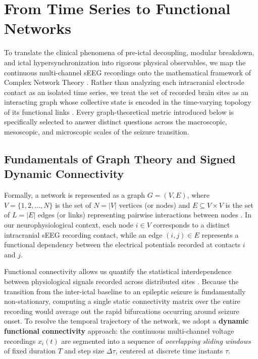 \section{From Time Series to Functional Networks}
\label{sec:theoretical_framework}

To translate the clinical phenomena of pre-ictal decoupling, modular breakdown, and ictal hypersynchronization into rigorous physical observables, we map the continuous multi-channel sEEG recordings onto the mathematical framework of Complex Network Theory \cite{newman2018networks, barabasi2016network}. Rather than analyzing each intracranial electrode contact as an isolated time series, we treat the set of recorded brain sites as an interacting graph whose collective state is encoded in the time-varying topology of its functional links \cite{bullmore2009complex}. Every graph-theoretical metric introduced below is specifically selected to answer distinct questions across the macroscopic, mesoscopic, and microscopic scales of the seizure transition.

\subsection{Fundamentals of Graph Theory and Signed Dynamic Connectivity}
Formally, a network is represented as a graph $G = (V, E)$, where $V = \{1, 2, \dots, N\}$ is the set of $N = |V|$ vertices (or nodes) and $E \subseteq V \times V$ is the set of $L = |E|$ edges (or links) representing pairwise interactions between nodes \cite{newman2018networks}. In our neurophysiological context, each node $i \in V$ corresponds to a distinct intracranial sEEG recording contact, while an edge $(i, j) \in E$ represents a functional dependency between the electrical potentials recorded at contacts $i$ and $j$.

Functional connectivity allows us quantify the statistical interdependence between physiological signals recorded across distributed sites \cite{bullmore2009complex}. Because the transition from the inter-ictal baseline to an epileptic seizure is fundamentally non-stationary, computing a single static connectivity matrix over the entire recording would average out the rapid bifurcations occurring around seizure onset. To resolve the temporal trajectory of the network, we adopt a \textbf{dynamic functional connectivity} approach: the continuous multi-channel voltage recordings $x_i(t)$ are segmented into a sequence of \textit{overlapping sliding windows} of fixed duration $T$ and step size $\Delta \tau$, centered at discrete time instants $\tau$.

